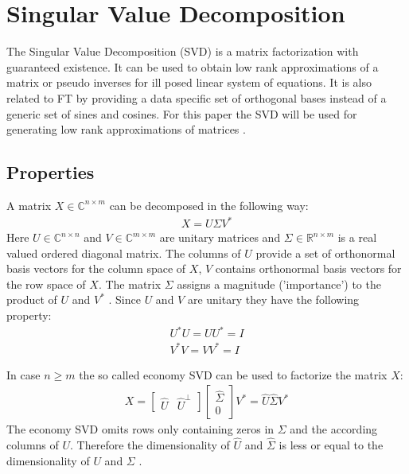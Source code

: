 \section{Singular Value Decomposition}
The Singular Value Decomposition (SVD) is a matrix factorization with guaranteed existence.
It can be used to obtain low rank approximations of a matrix or pseudo inverses for ill posed linear system of equations.
It is also related to FT by providing a data specific set of orthogonal bases instead of a generic set of sines and cosines. For this paper the SVD will be used for generating low rank approximations of matrices \cite{brunton_kutz_2019b}.
\subsection{Properties}
A matrix \(X \in \mathbb{C}^{n \times m}\) can be decomposed in the following way:
\begin{gather}
X = U \Sigma V^{*}
\end{gather}
Here \(U \in \mathbb{C}^{n \times n}\) and \(V \in \mathbb{C}^{m \times m}\) are unitary matrices and \(\Sigma \in \mathbb{R}^{n \times m}\) is a real valued ordered diagonal matrix.
The columns of \(U\) provide a set of orthonormal basis vectors for the column space of \(X\), \(V\) contains orthonormal basis vectors for the row space of \(X\). The matrix \(\Sigma\) assigns a magnitude ('importance') to the product of \(U\) and \(V^{*}\)  \cite{brunton_kutz_2019a}.
Since \(U\) and \(V\) are unitary they have the following property:
\begin{gather}
U^{*}U = UU^{*} = I \\
V^{*}V = VV^{*} = I
\end{gather}
\cite{SZABO2015385}


In case \(n \geq m\) the so called economy SVD can be used to factorize the matrix \(X\):
\begin{gather}
X = \begin{bmatrix}
\hat{U} & \hat{U}^{\bot}
\end{bmatrix} 
\begin{bmatrix}
\hat{\Sigma} \\
0
\end{bmatrix}
V^{*} = \hat{U} \hat{\Sigma} V^{*}
\end{gather} 
The economy SVD omits rows only containing zeros in \(\Sigma\) and the according columns of \(U\).
Therefore the dimensionality of \(\hat{U}\) and \(\hat{\Sigma}\) is less or equal to the dimensionality of \(U\) and \(\Sigma\) 
 \cite{brunton_kutz_2019b}.

